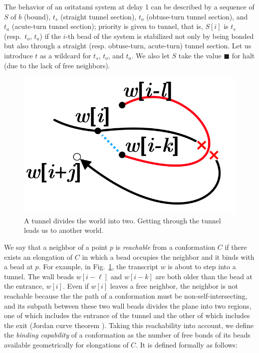 The behavior of an oritatami system at delay 1 can be described by a sequence of $S$ of $b$ (bound), $t_s$ (straight tunnel section), $t_o$ (obtuse-turn tunnel section), and $t_a$ (acute-turn tunnel section); priority is given to tunnel, that is, $S[i]$ is $t_s$ (resp.~$t_o$, $t_a$) if the $i$-th bead of the system is stabilized not only by being bonded but also through a straight (resp. obtuse-turn, acute-turn) tunnel section. 
Let us introduce $t$ as a wildcard for $t_s$, $t_o$, and $t_a$. 
We also let $S$ take the value $\blacksquare$ for halt (due to the lack of free neighbors). 


\begin{figure}[tb]
\centering
\includegraphics[width=0.5\linewidth]{Fig/jordan_curve.png}
\caption{A tunnel divides the world into two. 
Getting through the tunnel leads us to another world. 
}
\label{fig:Jordan}
\end{figure}

We say that a neighbor of a point $p$ is \textit{reachable} from a conformation $C$ if there exists an elongation of $C$ in which a bead occupies the neighbor and it binds with a bead at $p$. 
For example, in Fig.~\ref{fig:Jordan}, the transcript $w$ is about to step into a tunnel. 
The wall beads $w[i-\ell]$ and $w[i-k]$ are both older than the bead at the entrance, $w[i]$. 
Even if $w[i]$ leaves a free neighbor, the neighbor is not reachable because the the path of a conformation must be non-self-intersecting, and its subpath between these two wall beads divides the plane into two regions, one of which includes the entrance of the tunnel and the other of which includes the exit (Jordan curve theorem \cite{Hales2007}). 
Taking this reachability into account, we define the \textit{binding capability} of a conformation as the number of free bonds of its beads available geometrically for elongations of $C$.
It is defined formally as follows: 

